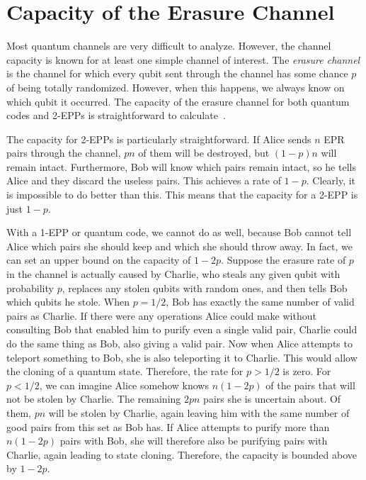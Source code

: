 \documentclass{report}
\begin{document}
\section{Capacity of the Erasure Channel}

Most quantum channels are very difficult to analyze.  However, the 
channel capacity is known for at least one simple channel of interest.  The 
{\em erasure channel} is the channel for which every qubit sent through the 
channel has some chance $p$ of being totally randomized.  However, when 
this happens, we always know on which qubit it occurred.  The capacity of 
the erasure channel for both quantum codes and 2-EPPs is straightforward 
to calculate~\cite{bennett-erasure}.

The capacity for 2-EPPs is particularly straightforward.  If Alice sends $n$ 
EPR pairs through the channel, $pn$ of them will be destroyed, but $(1-
p)n$ will remain intact.  Furthermore, Bob will know which pairs remain 
intact, so he tells Alice and they discard the useless pairs.  This achieves a 
rate of $1-p$.  Clearly, it is impossible to do better than this.  This means 
that the capacity for a 2-EPP is just $1-p$.

With a 1-EPP or quantum code, we cannot do as well, because Bob cannot 
tell Alice which pairs she should keep and which she should throw away.  In 
fact, we can set an upper bound on the capacity of $1-2p$.  Suppose the erasure 
rate of $p$ in the channel is actually caused by Charlie, who steals any 
given qubit with probability $p$, replaces any stolen qubits with random 
ones, and then tells Bob which qubits he stole.  When $p = 1/2$, Bob has 
exactly the same number of valid pairs as Charlie.  If there were any 
operations Alice could make without consulting Bob that enabled him to 
purify even a single valid pair, Charlie could do the same thing as Bob, also 
giving a valid pair.  Now when Alice attempts to teleport something to Bob, 
she is also teleporting it to Charlie.  This would allow the cloning of a 
quantum state.  Therefore, the rate for $p>1/2$ is zero.  For $p<1/2$, we 
can imagine Alice somehow knows $n(1-2p)$ of the pairs that will not be 
stolen by Charlie.  The remaining $2pn$ pairs she is uncertain about.  Of 
them, $pn$ will be stolen by Charlie, again leaving him with the same 
number of good pairs from this set as Bob has.  If Alice attempts to purify 
more than $n(1-2p)$ pairs with Bob, she will therefore also be purifying 
pairs with Charlie, again leading to state cloning.  Therefore, the capacity is 
bounded above by $1-2p$.
\end{document}
